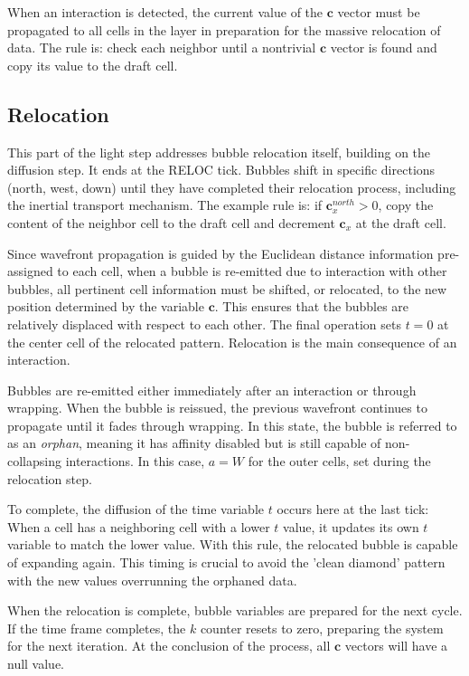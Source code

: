 \documentclass[12pt,english]{article}
\begin{document}
When an interaction is detected, the current value of the \(\mathbf{c}\) vector must be propagated to all cells in the layer in preparation for the massive relocation of data. The rule is: check each neighbor until a nontrivial \(\mathbf{c}\) vector is found and copy its value to the draft cell.

\subsection{Relocation} \label{subsec:relocation}
This part of the light step addresses bubble relocation itself, building on the diffusion step. It ends at the RELOC tick. Bubbles shift in specific directions (north, west, down) until they have completed their relocation process, including the inertial transport mechanism. The example rule is: if $\textbf{c}_x^{north}>0$, copy the content of the neighbor cell to the draft cell and decrement $\textbf{c}_x$ at the draft cell.

Since wavefront propagation is guided by the Euclidean distance information pre-assigned to each cell, when a bubble is re-emitted due to interaction with other bubbles, all pertinent cell information must be shifted, or relocated, to the new position determined by the variable $\textbf{c}$. This ensures that the bubbles are relatively displaced with respect to each other. The final operation sets $t=0$ at the center cell of the relocated pattern. Relocation is the main consequence of an interaction.

Bubbles are re-emitted either immediately after an interaction or through wrapping. When the bubble is reissued, the previous wavefront continues to propagate until it fades through wrapping. In this state, the bubble is referred to as an \textit{orphan}, meaning it has affinity disabled but is still capable of non-collapsing interactions. In this case, $a=W$ for the outer cells, set during the relocation step. 

To complete, the diffusion of the time variable $t$ occurs here at the last tick: When a cell has a neighboring cell with a lower $t$ value, it updates its own $t$ variable to match the lower value. With this rule, the relocated bubble is capable of expanding again. This timing is crucial to avoid the 'clean diamond' pattern with the new values overrunning the orphaned data.

When the relocation is complete, bubble variables are prepared for the next cycle. If the time frame completes, the $k$ counter resets to zero, preparing the system for the next iteration.  At the conclusion of the process, all $\boldsymbol{c}$ vectors will have a null value.
\end{document}
